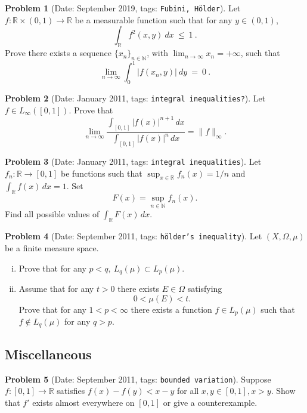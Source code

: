 \documentclass[11pt, notitlepage]{article}
\theoremstyle{definition}
\theoremstyle{definition}
\theoremstyle{definition}
\newtheorem{probstate}{Problem}
\theoremstyle{remark}
\newenvironment{problem}[2]{
    \begin{probstate}[Date: #1, tags: \texttt{#2}]
}
{
  \end{probstate}
}
\newcommand{\R}{\mathbb{R}}
\begin{document}
\begin{problem}{September 2019}{Fubini, Hölder}
    Let $f:\mathbb{R}\times (0,1)\to\mathbb{R}$ be a measurable function such that for any $y\in(0,1)$,
$$\int_{\mathbb{R}} f^2(x,y) \ dx \ \le \ 1\  .
$$
Prove there exists a sequence $\{x_n\}_{n\in\mathbb{N}}$, with $\lim_{n\to\infty}x_n=+\infty$, such that
$$\lim_{n\to\infty} \int_0^1 |f(x_n,y)| \ dy \ = \ 0 \  .
$$
\end{problem}

\begin{problem}{January 2011}{integral inequalities?}
  Let $f \in L_{\infty}([0,1])$. Prove that
 \[
   \lim_{n \to \infty} \frac{\int_{[0,1]} |f(x)|^{n+1} \, dx}{\int_{[0,1]} |f(x)|^{n} \, dx} = \|f\|_{\infty}.
 \]
\end{problem}

\begin{problem}{January 2011}{integral inequalities}
  Let $f_n: \mathbb{R} \to [0, 1]$ be functions such that
 $\sup_{x \in \mathbb{R}} f_n(x)=1/n$ and $\int_{\mathbb{R}} f(x) \, dx=1$. Set
 \[
  F(x)= \sup_{n \in \mathbb{N}} f_n(x).
 \]
 Find all possible values of $\int_{\mathbb{R}} F(x) \, dx$.

\end{problem}

\begin{problem}{September 2011}{hölder's inequality}
  Let $(X,\Omega, \mu)$ be a finite measure space.
 \begin{enumerate}[(i)]
   \item Prove that for any $p<q, \ L_q(\mu) \subset L_p(\mu)$.
   \item Assume that for any
 $t>0$ there exists $E \in \Omega$ satisfying
 \[
  0< \mu(E) <t.
 \]
 Prove that for any $1<p< \infty$ there exists a function $f \in
 L_p(\mu)$ such that $f \notin L_q(\mu)$ for any $q>p$.
\end{enumerate}
\end{problem}


\subsection{Miscellaneous}

\begin{problem}{September 2011}{bounded variation}
  Suppose $f:[0,1] \to \R$ satisfies $f(x)-f(y)<x-y$ for all $x,y\in [0,1], x>y$.
  Show that $f'$ exists almost everywhere on $[0,1]$ or give a counterexample.
\end{problem}
\end{document}
